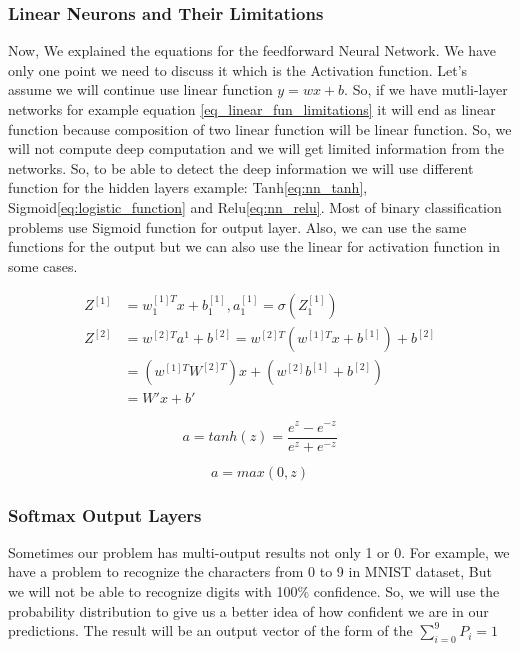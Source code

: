 \subsubsection{Linear Neurons and Their Limitations}

Now, We explained the equations for the feedforward Neural Network. We have only one point we need to discuss it which is the Activation function. Let's assume we will continue use linear function $y= w x + b$. So, if we have mutli-layer networks for example equation \eqref{eq_linear_fun_limitations} it will end as linear function because composition of two linear function will be linear function. So, we will not compute deep computation and we will get limited information from the networks. So, to be able to detect the deep information we will use different function for the hidden layers example: Tanh\eqref{eq:nn_tanh}, Sigmoid\eqref{eq:logistic_function} and Relu\eqref{eq:nn_relu}. Most of binary classification problems use Sigmoid function for output layer. Also, we can use the same functions for the output but we can also use the linear for activation function in some cases. 

\begin{subequations}\label{eq_linear_fun_limitations}
   \begin{align}
     Z^{[1]} & = w_1^{[1]T} x + b_1^{[1]} , a_1^{[1]} = \sigma(Z_1^{[1]}) \\
     Z^{[2]} & = w^{[2]T} a^1 + b^{[2]} = w^{[2]T} (w^{[1]T}x + b^{[1]}) + b^{[2]}\\
             & = (w^{[1]T}W^{[2]T})x + (w^{[2]}b^{[1]}+ b^{[2]})\\
             & = W' x + b'
\end{align}
\end{subequations}



 
\begin{equation}\label{eq:nn_tanh}
  a = tanh(z) =\frac{e^z-e^{-z}}{e^z+e^{-z}}
\end{equation}%



\begin{equation}\label{eq:nn_relu}
  a = max (0,z)
\end{equation}%

\subsubsection{Softmax Output Layers}
Sometimes our problem has multi-output results not only 1 or 0. For example, we have a problem to recognize the characters from 0 to 9 in MNIST dataset, But we will not be able to recognize digits with 100\% confidence. So, we will use the probability distribution to give us a better idea of how confident we are in our predictions. The result will be an output vector of the form of the $\sum_{i = 0}^9P_i=1$

